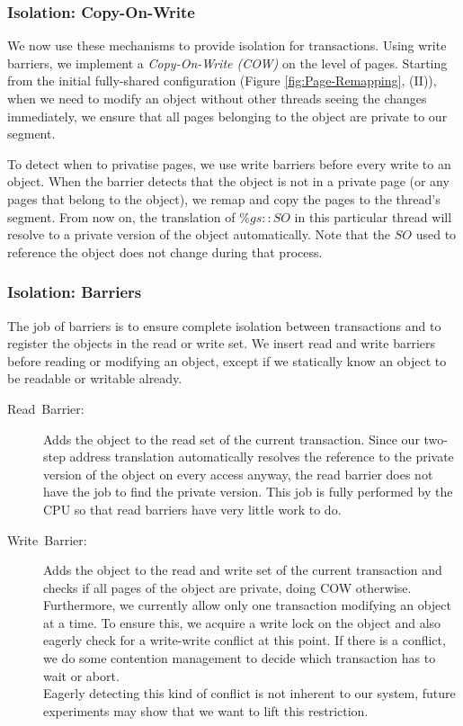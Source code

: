 \documentclass{sigplanconf}
\begin{document}
\subsubsection{Isolation: Copy-On-Write}

We now use these mechanisms to provide isolation for transactions.
Using write barriers, we implement a \emph{Copy-On-Write (COW)} on the
level of pages. Starting from the initial fully-shared configuration
(Figure \ref{fig:Page-Remapping}, (II)), when we need to modify an
object without other threads seeing the changes immediately, we ensure
that all pages belonging to the object are private to our segment.

To detect when to privatise pages, we use write barriers before every
write to an object. When the barrier detects that the object is not in
a private page (or any pages that belong to the object), we remap and
copy the pages to the thread's segment. From now on, the translation
of $\%gs{::}SO$ in this particular thread will resolve to a private
version of the object automatically. Note that the $SO$ used to reference
the object does not change during that process.



\subsubsection{Isolation: Barriers}

The job of barriers is to ensure complete isolation between transactions
and to register the objects in the read or write set. We insert read
and write barriers before reading or modifying an object, except if
we statically know an object to be readable or writable already.
\begin{description}
\item [{Read~Barrier:}] Adds the object to the read set of the current
  transaction. Since our two-step address translation automatically
  resolves the reference to the private version of the object on every
  access anyway, the read barrier does not have the job to find the
  private version. This job is fully performed by the CPU so that
  read barriers have very little work to do.
\item [{Write~Barrier:}] Adds the object to the read and write set of
  the current transaction and checks if all pages of the object are
  private, doing COW otherwise.\\
  Furthermore, we currently allow only one transaction modifying an
  object at a time. To ensure this, we acquire a write lock on the object
  and also eagerly check for a write-write conflict at this point. If
  there is a conflict, we do some contention management to decide which
  transaction has to wait or abort.\\
  Eagerly detecting this kind of conflict is not inherent to our
  system, future experiments may show that we want to lift this
  restriction.
\end{description}
\end{document}
